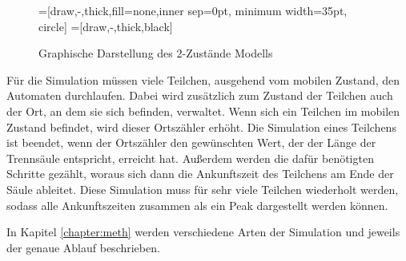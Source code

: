 \begin{figure}[ht]
 \centering

\usetikzlibrary{arrows,%
                topaths}%
=[draw,-,thick,fill=none,inner sep=0pt, minimum width=35pt, circle]
=[draw,-,thick,black]
\usetikzlibrary{arrows,decorations.pathmorphing,backgrounds,positioning,fit}

\caption{Graphische Darstellung des 2-Zustände Modells}
\label{tikz:2p_Mod}
\end{figure}

Für die Simulation müssen viele Teilchen, ausgehend vom mobilen Zustand, den Automaten durchlaufen. Dabei wird zusätzlich zum Zustand der Teilchen auch der Ort, an dem sie sich befinden, verwaltet. Wenn sich ein Teilchen im mobilen Zustand befindet, wird dieser Ortszähler erhöht. Die Simulation eines Teilchens ist beendet, wenn der Ortszähler den gewünschten Wert, der der Länge der Trennsäule entspricht, erreicht hat.
Außerdem werden die dafür benötigten Schritte gezählt, woraus sich dann die Ankunftszeit des Teilchens am Ende der Säule ableitet.
Diese Simulation muss für sehr viele Teilchen wiederholt werden, sodass alle Ankunftszeiten zusammen als ein Peak dargestellt werden können.


In Kapitel \ref{chapter:meth} werden verschiedene Arten der Simulation und jeweils der genaue Ablauf beschrieben.

